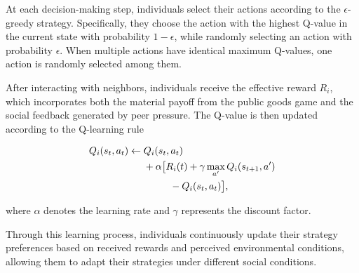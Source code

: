 \documentclass[%
  aip,
  amsmath,amssymb,
  reprint,
  showkeys,
]{revtex4-1}
\begin{document}
At each decision-making step, individuals select their actions according to the $\epsilon$-greedy strategy. Specifically, they choose the action with the highest Q-value in the current state with probability $1-\epsilon$, while randomly selecting an action with probability $\epsilon$. When multiple actions have identical maximum Q-values, one action is randomly selected among them.

After interacting with neighbors, individuals receive the effective reward $R_i$, which incorporates both the material payoff from the public goods game and the social feedback generated by peer pressure. The Q-value is then updated according to the Q-learning rule

\begin{equation}
\begin{aligned}
Q_i(s_t,a_t)\leftarrow{}&Q_i(s_t,a_t)\\
&+\alpha\bigl[R_i(t)+\gamma\max_{a'}Q_i(s_{t+1},a')\\
&\hspace{2.7em}-Q_i(s_t,a_t)\bigr],
\end{aligned}
\label{eq:q-learning}
\end{equation}

where $\alpha$ denotes the learning rate and $\gamma$ represents the discount factor. 

Through this learning process, individuals continuously update their strategy preferences based on received rewards and perceived environmental conditions, allowing them to adapt their strategies under different social conditions.
\end{document}
